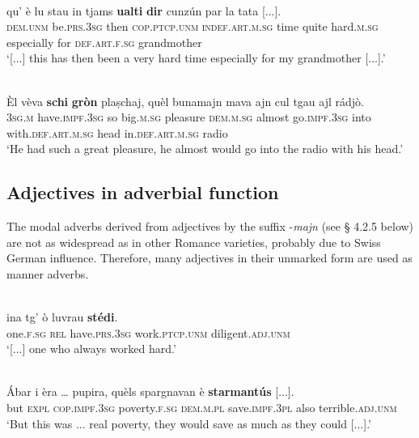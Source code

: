 \ea\label{}
\\
\gll [...] qu’ è lu stau in tjams \textbf{ualti} \textbf{dir} cunzún par la tata [...]. \\
{} \textsc{dem.unm} be.\textsc{prs.3sg} then \textsc{cop.ptcp.unm} \textsc{indef.art.m.sg} time quite hard.\textsc{m.sg} especially for \textsc{def.art.f.sg} grandmother \\
\glt `[...] this has then been a very hard time especially for my grandmother [...].'
\z

\ea
\label{}
\\
\gll    Èl vèva \textbf{schi} \textbf{gròn} plaṣchaj, quèl bunamajn mava ajn cul tgau ajl rádjò.\\
\textsc{3sg.m} have.\textsc{impf.3sg} so big.\textsc{m.sg} pleasure \textsc{dem.m.sg} almost go.\textsc{impf.3sg} into with.\textsc{def.art.m.sg} head in.\textsc{def.art.m.sg} radio\\
\glt `He had such a great pleasure, he almost would go into the radio with his head.'
\z


\subsection{Adjectives in adverbial function}
The modal adverbs derived from adjectives by the suffix -\textit{majn} (see § 4.2.5 below) are not as widespread as in other Romance varieties, probably due to Swiss German influence. Therefore, many adjectives in their unmarked form are used as manner adverbs.

\ea\label{}
\\
\gll [...] ina tg’ ò luvrau \textbf{stédi}.\\
{} one.\textsc{f.sg} \textsc{rel} have.\textsc{prs.3sg} work.\textsc{ptcp.unm} diligent.\textsc{adj.unm} \\
\glt `[...] one who always worked hard.'
\z

\ea\label{}
\\
\gll   Ábar i èra … pupira, quèls spargnavan è \textbf{starmantús} [...].\\
but \textsc{expl}  \textsc{cop.impf.3sg} {} poverty.\textsc{f.sg} \textsc{dem.m.pl} save.\textsc{impf.3pl} also terrible.\textsc{adj.unm}\\
\glt `But this was ... real poverty, they would save as much as they could [...].'
\z

